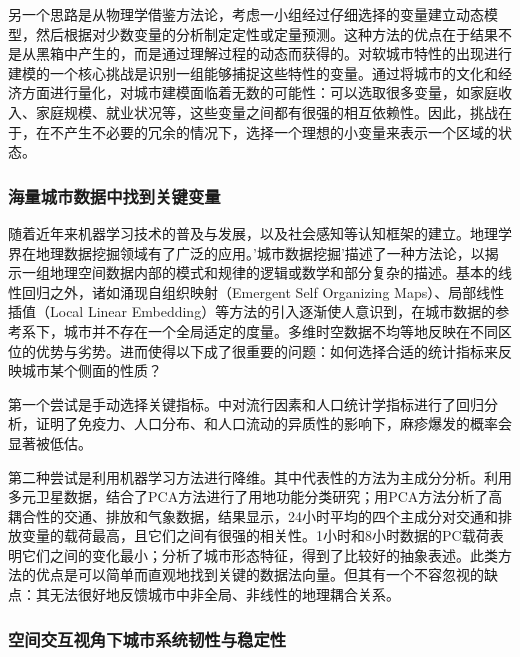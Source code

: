 另一个思路是从物理学借鉴方法论，考虑一小组经过仔细选择的变量建立动态模型，然后根据对少数变量的分析制定定性或定量预测。这种方法的优点在于结果不是从黑箱中产生的，而是通过理解过程的动态而获得的。对软城市特性的出现进行建模的一个核心挑战是识别一组能够捕捉这些特性的变量。通过将城市的文化和经济方面进行量化，对城市建模面临着无数的可能性：可以选取很多变量，如家庭收入、家庭规模、就业状况等，这些变量之间都有很强的相互依赖性。因此，挑战在于，在不产生不必要的冗余的情况下，选择一个理想的小变量来表示一个区域的状态。

\subsubsection{海量城市数据中找到关键变量}

随着近年来机器学习技术的普及与发展，以及社会感知等认知框架的建立。地理学界在地理数据挖掘领域有了广泛的应用。'城市数据挖掘'描述了一种方法论，以揭示一组地理空间数据内部的模式和规律的逻辑或数学和部分复杂的描述\cite{behnisch2009urban, bendimerad2016unsupervised}。基本的线性回归之外，诸如涌现自组织映射（Emergent Self Organizing Maps）、局部线性插值（Local Linear Embedding）等方法的引入逐渐使人意识到，在城市数据的参考系下，城市并不存在一个全局适定的度量。多维时空数据不均等地反映在不同区位的优势与劣势。进而使得以下成了很重要的问题：如何选择合适的统计指标来反映城市某个侧面的性质？

第一个尝试是手动选择关键指标。\cite{bosetti2020heterogeneity}中对流行因素和人口统计学指标进行了回归分析，证明了免疫力、人口分布、和人口流动的异质性的影响下，麻疹爆发的概率会显著被低估。


第二种尝试是利用机器学习方法进行降维。其中代表性的方法为主成分分析。\cite{deng2008pca}利用多元卫星数据，结合了PCA方法进行了用地功能分类研究；\cite{nagendra2003principal}用PCA方法分析了高耦合性的交通、排放和气象数据，结果显示，24小时平均的四个主成分对交通和排放变量的载荷最高，且它们之间有很强的相关性。1小时和8小时数据的PC载荷表明它们之间的变化最小；\cite{palmason2005classification}分析了城市形态特征，得到了比较好的抽象表述。此类方法的优点是可以简单而直观地找到关键的数据法向量。但其有一个不容忽视的缺点：其无法很好地反馈城市中非全局、非线性的地理耦合关系。


\subsubsection{空间交互视角下城市系统韧性与稳定性}

